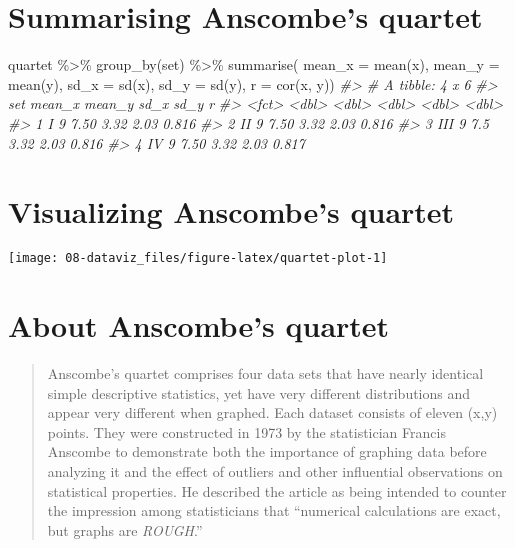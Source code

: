 \documentclass[
]{book}
\newenvironment{Shaded}{\begin{snugshade}}{\end{snugshade}}
\newcommand{\AttributeTok}[1]{\textcolor[rgb]{0.77,0.63,0.00}{#1}}
\newcommand{\CommentTok}[1]{\textcolor[rgb]{0.56,0.35,0.01}{\textit{#1}}}
\newcommand{\FunctionTok}[1]{\textcolor[rgb]{0.00,0.00,0.00}{#1}}
\newcommand{\NormalTok}[1]{#1}
\newcommand{\SpecialCharTok}[1]{\textcolor[rgb]{0.00,0.00,0.00}{#1}}
\theoremstyle{definition}
\theoremstyle{definition}
\theoremstyle{definition}
\theoremstyle{definition}
\theoremstyle{remark}
\begin{document}
\hypertarget{summarising-anscombes-quartet}{%
\section{Summarising Anscombe's quartet}\label{summarising-anscombes-quartet}}

\begin{Shaded}
\begin{Highlighting}[]
\NormalTok{quartet }\SpecialCharTok{\%\textgreater{}\%}
  \FunctionTok{group\_by}\NormalTok{(set) }\SpecialCharTok{\%\textgreater{}\%}
  \FunctionTok{summarise}\NormalTok{(}
    \AttributeTok{mean\_x =} \FunctionTok{mean}\NormalTok{(x), }
    \AttributeTok{mean\_y =} \FunctionTok{mean}\NormalTok{(y),}
    \AttributeTok{sd\_x =} \FunctionTok{sd}\NormalTok{(x),}
    \AttributeTok{sd\_y =} \FunctionTok{sd}\NormalTok{(y),}
    \AttributeTok{r =} \FunctionTok{cor}\NormalTok{(x, y))}
\CommentTok{\#\textgreater{} \# A tibble: 4 x 6}
\CommentTok{\#\textgreater{}   set   mean\_x mean\_y  sd\_x  sd\_y     r}
\CommentTok{\#\textgreater{}   \textless{}fct\textgreater{}  \textless{}dbl\textgreater{}  \textless{}dbl\textgreater{} \textless{}dbl\textgreater{} \textless{}dbl\textgreater{} \textless{}dbl\textgreater{}}
\CommentTok{\#\textgreater{} 1 I          9   7.50  3.32  2.03 0.816}
\CommentTok{\#\textgreater{} 2 II         9   7.50  3.32  2.03 0.816}
\CommentTok{\#\textgreater{} 3 III        9   7.5   3.32  2.03 0.816}
\CommentTok{\#\textgreater{} 4 IV         9   7.50  3.32  2.03 0.817}
\end{Highlighting}
\end{Shaded}

\hypertarget{visualizing-anscombes-quartet}{%
\section{Visualizing Anscombe's quartet}\label{visualizing-anscombes-quartet}}

\begin{center}\texttt{[image: 08-dataviz\_files/figure-latex/quartet-plot-1]} \end{center}

\hypertarget{about-anscombes-quartet}{%
\section{About Anscombe's quartet}\label{about-anscombes-quartet}}

\begin{quote}
Anscombe's quartet comprises four data sets that have nearly identical simple descriptive statistics, yet have very different distributions and appear very different when graphed. Each dataset consists of eleven (x,y) points. They were constructed in 1973 by the statistician Francis Anscombe to demonstrate both the importance of graphing data before analyzing it and the effect of outliers and other influential observations on statistical properties. He described the article as being intended to counter the impression among statisticians that ``numerical calculations are exact, but graphs are \emph{ROUGH}.''
\end{quote}
\end{document}

